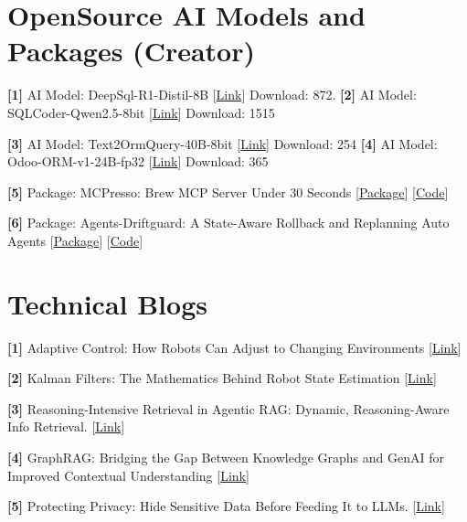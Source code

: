 \documentclass[10pt,letterpaper]{article}
\newcommand{\lk}[2]{[\href{#1}{#2}]}
\begin{document}
\section{OpenSource AI Models and Packages (Creator)}
\textbf{[1]} AI Model: DeepSql-R1-Distil-8B \lk{https://doi.org/10.57967/hf/10288}{Link} Download: 872. \hfill \textbf{[2]} AI Model: SQLCoder-Qwen2.5-8bit \lk{https://doi.org/10.57967/hf/4444}{Link} Download: 1515\par
\textbf{[3]} AI Model: Text2OrmQuery-40B-8bit \lk{https://doi.org/10.57967/hf/10289}{Link} Download: 254 \hfill \textbf{[4]} AI Model: Odoo-ORM-v1-24B-fp32 \lk{https://doi.org/10.57967/hf/10290}{Link} Download: 365\par
\textbf{[5]} Package: MCPresso: Brew MCP Server Under 30 Seconds \lk{https://pypi.org/project/mcpresso/}{Package} \lk{https://github.com/imsanjoykb/mcpresso}{Code}\par
\textbf{[6]} Package: Agents-Driftguard: A State-Aware Rollback and Replanning Auto Agents \lk{https://pypi.org/project/agents-driftguard/1.1.0/}{Package} \lk{https://github.com/imsanjoykb/agents-driftguard}{Code}\par

\section{Technical Blogs}
\textbf{[1]} Adaptive Control: How Robots Can Adjust to Changing Environments \lk{https://medium.com/@imsanjoykb/adaptive-control-how-robots-can-adjust-to-changing-environments-57d5705e28e3}{Link}\par
\textbf{[2]} Kalman Filters: The Mathematics Behind Robot State Estimation \lk{https://medium.com/@imsanjoykb/2d5029b8a58a}{Link}\par
\textbf{[3]} Reasoning-Intensive Retrieval in Agentic RAG: Dynamic, Reasoning-Aware Info Retrieval. \lk{https://medium.com/@imsanjoykb/reasoning-intensive-retrieval-in-agentic-rag-dynamic-reasoning-aware-information-retrieval-ff216da9ffef}{Link}\par
\textbf{[4]} GraphRAG: Bridging the Gap Between Knowledge Graphs and GenAI for Improved Contextual Understanding \lk{http://medium.com/@imsanjoykb/graphrag-bridging-the-gap-between-knowledge-graphs-and-genai-for-improved-contextual-understanding-a508fea238ce}{Link}\par
\textbf{[5]} Protecting Privacy: Hide Sensitive Data Before Feeding It to LLMs. \lk{https://medium.com/@imsanjoykb/protecting-privacy-hide-sensitive-data-before-feeding-it-to-llms-6e0b6817a7b9}{Link}\par
\end{document}
